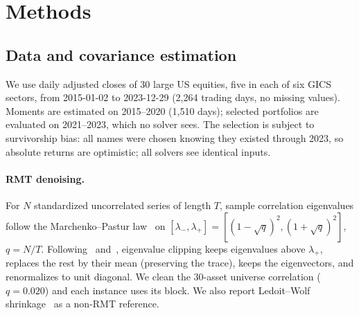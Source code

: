 \documentclass[11pt]{article}
\begin{document}
\section{Methods}\label{sec:methods}
\subsection{Data and covariance estimation}
We use daily adjusted closes of 30 large US equities, five in each of six GICS sectors, from
2015-01-02 to 2023-12-29 (2{,}264 trading days, no missing values). Moments are estimated on
2015--2020 (1{,}510 days); selected portfolios are evaluated on 2021--2023, which no solver sees.
The selection is subject to survivorship bias: all names were chosen knowing they existed through
2023, so absolute returns are optimistic; all solvers see identical inputs.

\paragraph{RMT denoising.} For $N$ standardized uncorrelated series of length $T$, sample
correlation eigenvalues follow the Marchenko--Pastur law~\citep{marchenko1967} on
$[\lambda_-,\lambda_+]=[(1-\sqrt{q})^2,(1+\sqrt{q})^2]$, $q=N/T$. Following~\citet{laloux1999}
and~\citet{bun2017}, eigenvalue clipping keeps eigenvalues above $\lambda_+$, replaces the rest by
their mean (preserving the trace), keeps the eigenvectors, and renormalizes to unit diagonal. We
clean the 30-asset universe correlation ($q=0.020$) and each instance uses its block. We also
report Ledoit--Wolf shrinkage~\citep{ledoit2004} as a non-RMT reference.
\end{document}
